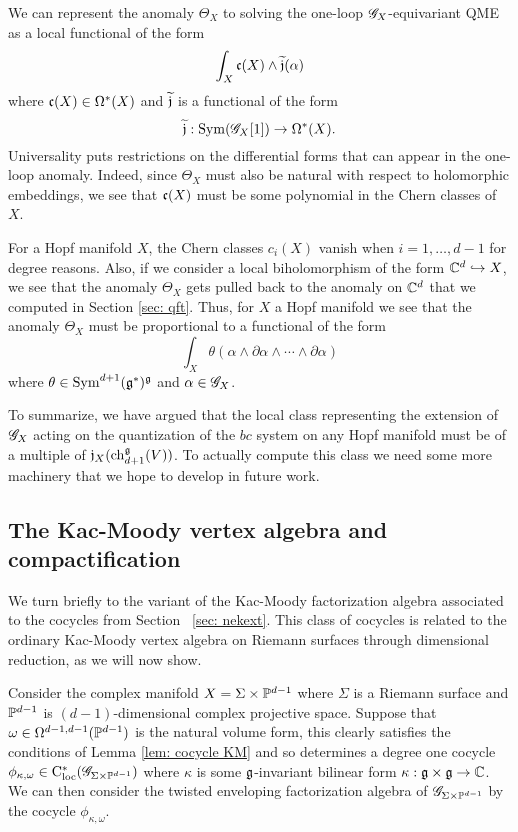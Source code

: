 We can represent the anomaly $\Theta_X$ to solving the one-loop $\mathscr G_X$-equivariant QME as a local functional of the form
\[
\int_X \mathfrak c(X) \wedge \widetilde{\mathfrak j}(\alpha)
\]
where $\mathfrak c(X) \in \Omega^*(X)$ and $\widetilde{\mathfrak j}$ is a functional of the form
\[
\widetilde{\mathfrak j} : {\rm Sym}(\mathscr G_X[1]) \to \Omega^*(X) .
\]
Universality puts restrictions on the differential forms that can appear in the one-loop anomaly. 
Indeed, since $\Theta_X$ must also be natural with respect to holomorphic embeddings, we see that $\mathfrak c(X)$ must be some polynomial in the Chern classes of $X$. 

For a Hopf manifold $X$, the Chern classes $c_i(X)$ vanish when $i=1,\ldots,d-1$ for degree reasons. 
Also, if we consider a local biholomorphism of the form $\mathbb C^d \hookrightarrow X$, we see that the anomaly $\Theta_X$ gets pulled back to the anomaly on $\mathbb C^d$ that we computed in Section \ref{sec: qft}. 
Thus, for $X$ a Hopf manifold we see that the anomaly $\Theta_X$ must be proportional to a functional of the form
\[
\int_X \theta(\alpha \wedge \partial \alpha \wedge \cdots \wedge \partial \alpha)
\]
where $\theta \in {\rm Sym}^{d+1}(\mathfrak g^*)^\mathfrak g$ and $\alpha \in \mathscr G_X$. 

To summarize, we have argued that the local class representing the extension of $\mathscr G_X$ acting on the quantization of the $bc$ system on any Hopf manifold must be of a multiple of $\mathfrak j_X({\rm ch}_{d+1}^\mathfrak g(V))$. 
To actually compute this class we need some more machinery that we hope to develop in future work. 

\subsection{The Kac-Moody vertex algebra and compactification} 

We turn briefly to the variant of the Kac-Moody factorization algebra associated to the cocycles from Section ~\ref{sec: nekext}.
This class of cocycles is related to the ordinary Kac-Moody vertex algebra on Riemann surfaces through dimensional reduction, as we will now show. 

Consider the complex manifold $X = \Sigma \times \mathbb P^{d-1}$ where $\Sigma$ is a Riemann surface and $\mathbb P^{d-1}$ is $(d-1)$-dimensional complex projective space.
Suppose that $\omega \in \Omega^{d-1,d-1}(\mathbb P^{d-1})$ is the natural volume form, this clearly satisfies the conditions of Lemma \ref{lem: cocycle KM} and so determines a degree one cocycle $\phi_{\kappa, \omega} \in {\rm C}_{\rm loc}^*(\mathscr G_{\Sigma \times \mathbb P^{d-1}})$ where $\kappa$ is some $\mathfrak g$-invariant bilinear form $\kappa : \mathfrak g \times \mathfrak g \to \mathbb C$. 
We can then consider the twisted enveloping factorization algebra of $\mathscr G_{\Sigma \times \mathbb P^{d-1}}$ by the cocycle $\phi_{\kappa, \omega}$. 

